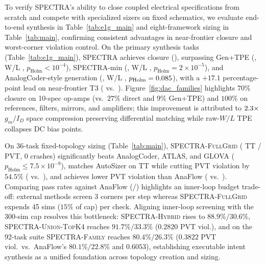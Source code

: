 \documentclass[sigconf,review,anonymous]{acmart}
\begin{document}
To verify \textsc{SPECTRA}'s ability to close coupled electrical specifications from scratch and compete with specialized sizers on fixed schematics, we evaluate end-to-end synthesis in Table~\ref{tab:e1g_main} and eight-framework sizing in Table~\ref{tab:main}, confirming consistent advantages in near-frontier closure and worst-corner violation control.
On the \NPrimaryTasks{} primary synthesis tasks (Table~\ref{tab:e1g_main}), \textsc{SPECTRA} achieves \SpectraPrim{} closure (\SpectraPrimCI{}), surpassing Gen+TPE (\GenboPrim{}, W/L \PrimGenboWL{}, $p_{\text{Holm}}<10^{-4}$), SPECTRA-min (\SpectraMinPrim{}, W/L \PrimSpectraMinWL{}, $p_{\text{Holm}}=2\times 10^{-5}$), and AnalogCoder-style generation (\DirectPrim{}, W/L \PrimDirectWL{}, $p_{\text{Holm}}=0.085{}$), with a $+17.1$ percentage-point lead on near-frontier T3 (\SpectraTThree{} vs.\ \DirectTThree{}). Figure~\ref{fig:dac_families} highlights $70\%$ closure on 10-spec op-amps (vs.\ $27\%$ direct and $9\%$ Gen+TPE) and $100\%$ on references, filters, mirrors, and amplifiers; this improvement is attributed to $2.3{}\times$ $g_m/I_D$ space compression preserving differential matching while raw-$W/L$ TPE collapses DC bias points.

On 36-task fixed-topology sizing (Table~\ref{tab:main}), \textsc{SPECTRA-FullGrid} (\SizSpectraTTPct{} TT / \SizSpectraPVTPct{} PVT, 0 crashes) significantly beats AnalogCoder, ATLAS, and GLOVA ($p_{\text{Holm}} \le 7.5\times 10^{-9}$), matches AutoSizer on TT while cutting PVT violation by $54.5\%$ (\SizSpectraPVTViol{} vs.\ \SizAutoSizerPVTViol{}), and achieves lower PVT violation than AnaFlow (\SizSpectraPVTViol{} vs.\ \SizAnaFlowPVTViol{}). Comparing pass rates against AnaFlow (\SizAnaFlowTTPct{}/\SizAnaFlowPVTPct{}) highlights an inner-loop budget trade-off: external methods screen 3 corners per step whereas \textsc{SPECTRA-FullGrid} expends 45 sims ($15\%$ of cap) per check. Aligning inner-loop screening with the 300-sim cap resolves this bottleneck: \textsc{SPECTRA-Hybrid} rises to $88.9\%/30.6\%$, \textsc{SPECTRA-Union-TopK4} reaches $91.7\%/33.3\%$ ($0.2820$ PVT viol.), and on the 92-task suite \textsc{SPECTRA-Family} reaches $80.4\%/26.3\%$ ($0.3822$ PVT viol.\ vs.\ AnaFlow's $80.1\%/22.8\%$ and $0.6053$), establishing executable intent synthesis as a unified foundation across topology creation and sizing.
\end{document}
